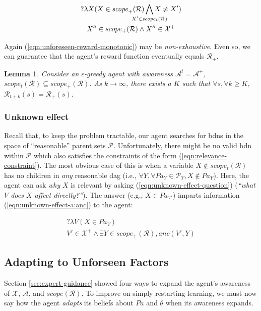 \documentclass{article}
\newcommand{\bdn}{{\sc bdn}}
\newcommand{\Pa}{\mathit{Pa}}
\renewcommand{\dag}{{\sc dag}}
\newtheorem{lemma}{Lemma}
\begin{document}
	\begin{gather}
	\label{eqn:unforeseen-reward-q}
	?\lambda X(X\in \mathit{scope}_+(\mathcal{R}) \bigwedge_{\mathclap{X'\in scope_t(\mathcal{R})}}
	X\neq X') \\
	\label{eqn:unforeseen-reward-monotonic}
	X'' \in scope_+(\mathcal{R}) \wedge X'' \in \mathcal{X}^+
	\end{gather}
	
	Again (\ref{eqn:unforeseen-reward-monotonic}) may be \emph{non-exhaustive}. Even so, we can guarantee that the agent's reward function eventually equals $\mathcal{R}_+$.
	
	\begin{lemma}
		\label{thm:reward-scope-awareness}
		Consider an $\epsilon$-greedy agent with awareness $\mathcal{A}^t = \mathcal{A}^+$, $scope_t(\mathcal{R}) \subseteq scope_+(\mathcal{R})$. As $k \rightarrow \infty$, there exists a $K$ such that $\forall s, \forall k \geq K$, $\mathcal{R}_{t+k}(s) = \mathcal{R}_{+}(s)$.
	\end{lemma}
	
	\subsubsection{Unknown effect}
	
	Recall that, to keep the problem tractable, our agent searches for \bdn{}s in the space of ``reasonable'' parent sets $\mathcal{P}$. Unfortunately, there might be no valid \bdn{} within $\mathcal{P}$ which also satisfies the constraints of the form (\ref{eqn:relevance-constraint}). The most obvious case of this is when a variable $X \notin scope_t(\mathcal{R})$ has no children in \emph{any} reasonable \dag{} (i.e., $\forall Y, \forall \Pa_Y \in \mathcal{P}_Y, X \notin \Pa_Y$). Here, the agent can ask \emph{why} $X$ is relevant by asking (\ref{eqn:unknown-effect-question}) (\emph{``what $V$ does $X$ affect directly?''}). The answer (e.g., $X \in \Pa_{V'}$) imparts information (\ref{eqn:unknown-effect-a:anc}) to the agent:
	
	\begin{gather}
	\label{eqn:unknown-effect-question}
	? \lambda V (X \in \Pa_V) \\
	\label{eqn:unknown-effect-a:anc}
	V' \in \mathcal{X}^+ \wedge \exists Y \in scope_+(\mathcal{R}), anc(V', Y)
	\end{gather}
	
	\subsection{Adapting to Unforseen Factors}
	\label{sec:adapting}
	Section \ref{sec:expert-guidance} showed four ways to expand the agent's awareness of $\mathcal{X}$, $\mathcal{A}$, and $scope(\mathcal{R})$. To improve on simply restarting learning, we must now say how the agent \emph{adapts} its beliefs about $\Pa$ and $\theta$ when its awareness expands.
	
\end{document}
